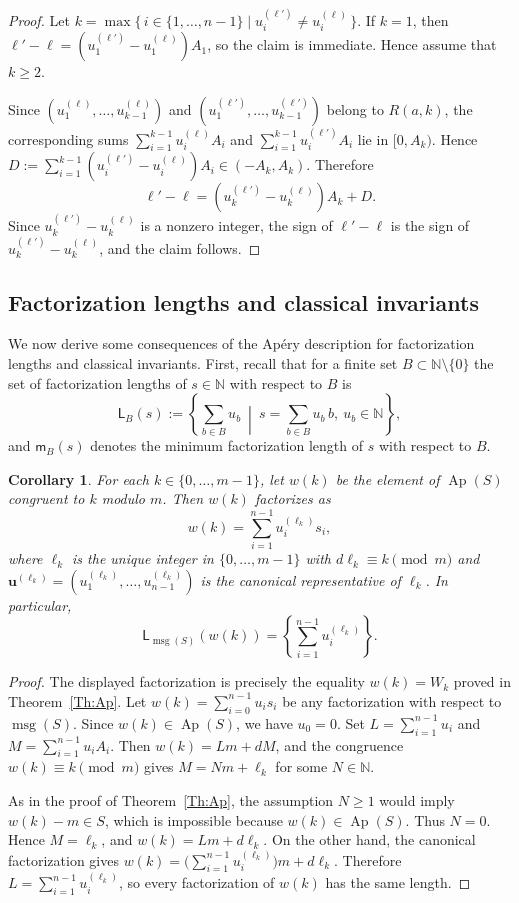 \documentclass[12pt,a4paper]{amsart}
\newtheorem{corollary}[theorem]{Corollary}
\theoremstyle{definition}
\begin{document}
\begin{proof}
Let $k=\max\{\,i\in\{1,\ldots,n-1\}\mid
u_i^{(\ell')}\neq u_i^{(\ell)}\,\}$. If $k=1$, then
$\ell'-\ell=(u^{(\ell')}_1-u^{(\ell)}_1)A_1$, so the claim is immediate.
Hence assume that $k\ge 2$.

Since
$(u_1^{(\ell)},\ldots,u_{k-1}^{(\ell)})$ and
$(u_1^{(\ell')},\ldots,u_{k-1}^{(\ell')})$ belong to $R(a,k)$, the
corresponding sums
$\sum_{i=1}^{k-1}u_i^{(\ell)}A_i$ and
$\sum_{i=1}^{k-1}u_i^{(\ell')}A_i$ lie in $[0,A_k)$. Hence
$D:=\sum_{i=1}^{k-1}(u_i^{(\ell')}-u_i^{(\ell)})A_i \in(-A_k,A_k)$.
Therefore
\[
\ell'-\ell=(u_k^{(\ell')}-u_k^{(\ell)})A_k+D.
\]
Since $u_k^{(\ell')}-u_k^{(\ell)}$ is a nonzero integer, the sign of
$\ell'-\ell$ is the sign of $u_k^{(\ell')}-u_k^{(\ell)}$, and the claim
follows.
\end{proof}

\subsection{Factorization lengths and classical invariants} 

We now derive some consequences of the Ap\'ery description for factorization lengths and classical invariants. First, recall that for a finite set $B\subset\mathbb{N}\setminus\{0\}$ the set of factorization lengths of
$s\in\mathbb{N}$ with respect to $B$ is
\[
\mathsf{L}_B(s):=\left\{\sum_{b\in B} u_b\ \middle|\ s=\sum_{b\in B} u_b\,b,\ u_b\in\mathbb{N}\right\},
\]
and $\mathsf{m}_B(s)$ denotes the minimum factorization length of $s$ with respect to $B$.

\begin{corollary}
For each $k\in\{0,\ldots,m-1\}$, let $w(k)$ be the element of $\operatorname{Ap}(S)$ congruent to $k$ modulo $m$. Then $w(k)$ factorizes as
\[
w(k)=\sum_{i=1}^{n-1}u^{(\ell_k)}_i s_i,
\]
where $\ell_k$ is the unique integer in $\{0,\ldots,m-1\}$ with $d\ell_k\equiv k\pmod m$ and $\mathbf{u}^{(\ell_k)}=(u^{(\ell_k)}_1,\ldots,u^{(\ell_k)}_{n-1})$ is the canonical representative of $\ell_k$. In particular,
\[
\mathsf{L}_{\operatorname{msg}(S)}(w(k))
=
\left\{\sum_{i=1}^{n-1}u^{(\ell_k)}_i\right\}.
\]
\end{corollary}

\begin{proof}
The displayed factorization is precisely the equality $w(k)=W_k$ proved in Theorem~\ref{Th:Ap}. Let $w(k)=\sum_{i=0}^{n-1}u_is_i$ be any factorization with respect to $\operatorname{msg}(S)$. Since $w(k)\in\operatorname{Ap}(S)$, we have $u_0=0$. Set $L=\sum_{i=1}^{n-1}u_i$ and $M=\sum_{i=1}^{n-1}u_iA_i$. Then $w(k)=Lm+dM$, and the congruence $w(k)\equiv k\pmod m$ gives $M=Nm+\ell_k$ for some $N\in\mathbb N$.

As in the proof of Theorem~\ref{Th:Ap}, the assumption $N\ge 1$ would imply $w(k)-m\in S$, which is impossible because $w(k)\in\operatorname{Ap}(S)$. Thus $N=0$. Hence $M=\ell_k$, and $w(k)=Lm+d\ell_k$. On the other hand, the canonical factorization gives $w(k)=\bigl(\sum_{i=1}^{n-1}u_i^{(\ell_k)}\bigr)m+d\ell_k$. Therefore $L=\sum_{i=1}^{n-1}u_i^{(\ell_k)}$, so every factorization of $w(k)$ has the same length.
\end{proof}
\end{document}
